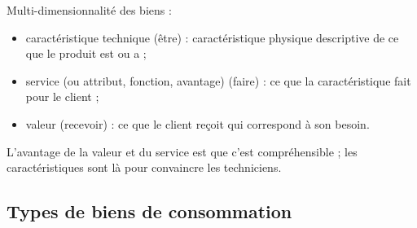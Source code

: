 		
		


		Multi-dimensionnalité des biens :

		\begin{itemize}
			\item caractéristique technique (être) : caractéristique physique descriptive de ce que le produit est ou a ;
			\item service (ou attribut, fonction, avantage) (faire) : ce que la caractéristique fait pour le client ;
			\item valeur (recevoir) : ce que le client reçoit qui correspond à son besoin.
		\end{itemize}

		L'avantage de la valeur et du service est que c'est compréhensible ; les caractéristiques sont là pour convaincre les techniciens.


		\subsection{Types de biens de consommation}

